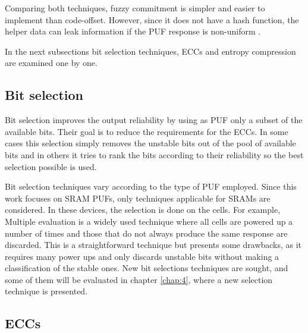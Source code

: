 Comparing both techniques, fuzzy commitment is simpler and easier to implement than code-offset. However, since it does not have a hash function, the helper data can leak information if the PUF response is non-uniform \cite{Dodis2004}.

In the next subsections bit selection techniques, ECCs and entropy compression are examined one by one.





\subsection{Bit selection}


Bit selection improves the output reliability by using as PUF only a subset of the available bits. Their goal is to reduce the requirements for the ECCs. In some cases this selection simply removes the unstable bits out of the pool of available bits and in others it tries to rank the bits according to their reliability so the best selection possible is used. 


Bit selection techniques vary according to the type of PUF employed. Since this work focuses on SRAM PUFs, only techniques applicable for SRAMs are considered. In these devices, the selection is done on the cells. For example, Multiple evaluation \cite{Baturone2015} is a widely used technique where all cells are powered up a number of times and those that do not always produce the same response are discarded. This is a straightforward technique but presents some drawbacks, as it requires many power ups and only discards unstable bits without making a classification of the stable ones. New bit selections techniques are sought, and some of them will be evaluated in chapter \ref{chap:4}, where a new selection technique is presented.


\subsection{ECCs}

\label{ss:ecc}



